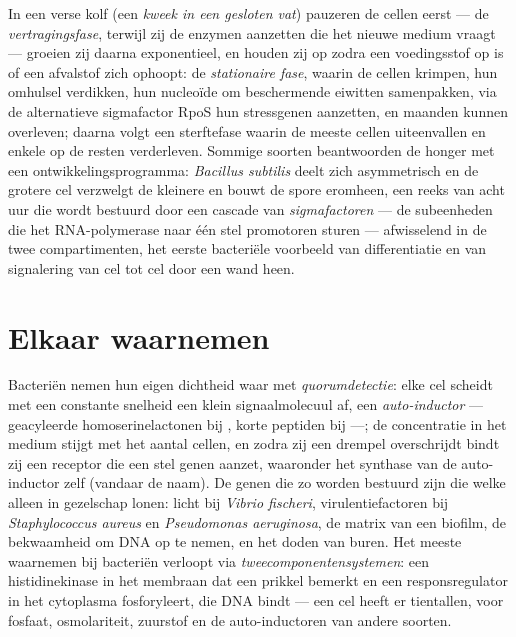 \begin{definition}\label{def:b3:bacteriology:phases}
In een verse kolf (een \emph{kweek in een gesloten vat}) pauzeren de
cellen eerst --- de \emph{vertragingsfase}, terwijl zij de enzymen
aanzetten die het nieuwe medium vraagt --- groeien zij daarna
exponentieel, en houden zij op zodra een voedingsstof op is of een
afvalstof zich ophoopt: de \emph{stationaire fase}, waarin de cellen
krimpen, hun omhulsel verdikken, hun nucleoïde om beschermende eiwitten
samenpakken, via de alternatieve sigmafactor RpoS hun stressgenen
aanzetten, en maanden kunnen overleven; daarna volgt een sterftefase
waarin de meeste cellen uiteenvallen en enkele op de resten
verderleven. Sommige soorten beantwoorden de honger met een
ontwikkelingsprogramma: \emph{Bacillus subtilis} deelt zich asymmetrisch
en de grotere cel verzwelgt de kleinere en bouwt de spore eromheen, een
reeks van acht uur die wordt bestuurd door een cascade van
\emph{sigmafactoren} --- de subeenheden die het RNA-polymerase naar één
stel promotoren sturen --- afwisselend in de twee compartimenten, het
eerste bacteriële voorbeeld van differentiatie en van signalering van
cel tot cel door een wand heen.
\end{definition}

\section{Elkaar waarnemen}

\begin{definition}[Quorumdetectie]\label{def:b3:bacteriology:quorum}
Bacteriën nemen hun eigen dichtheid waar met \emph{quorumdetectie}:
elke cel scheidt met een constante snelheid een klein signaalmolecuul
af, een \emph{auto-inductor} --- geacyleerde homoserinelactonen bij
, korte peptiden bij  ---; de concentratie
in het medium stijgt met het aantal cellen, en zodra zij een drempel
overschrijdt bindt zij een receptor die een stel genen aanzet, waaronder
het synthase van de auto-inductor zelf (vandaar de naam). De genen die
zo worden bestuurd zijn die welke alleen in gezelschap lonen: licht bij
\emph{Vibrio fischeri}, virulentiefactoren bij \emph{Staphylococcus
aureus} en \emph{Pseudomonas aeruginosa}, de matrix van een biofilm, de
bekwaamheid om DNA op te nemen, en het doden van buren. Het meeste
waarnemen bij bacteriën verloopt via \emph{tweecomponentensystemen}:
een histidinekinase in het membraan dat een prikkel bemerkt en een
responsregulator in het cytoplasma fosforyleert, die DNA bindt --- een
cel heeft er tientallen, voor fosfaat, osmolariteit, zuurstof en de
auto-inductoren van andere soorten.
\end{definition}

